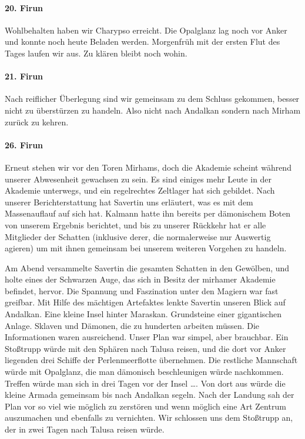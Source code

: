 \paragraph{20. Firun}
Wohlbehalten haben wir Charypso erreicht. Die Opalglanz lag noch vor Anker und konnte noch heute Beladen werden. Morgenfrüh mit der ersten Flut des Tages laufen wir aus. Zu klären bleibt noch wohin.

\paragraph{21. Firun}
Nach reiflicher Überlegung sind wir gemeinsam zu dem Schluss gekommen, besser nicht zu überstürzen zu handeln. Also nicht nach Andalkan sondern nach Mirham zurück zu kehren.

\paragraph{26. Firun}
Erneut stehen wir vor den Toren Mirhams, doch die Akademie scheint während unserer Abwesenheit gewachsen zu sein. Es sind einiges mehr Leute in der Akademie unterwegs, und ein regelrechtes Zeltlager hat sich gebildet.
Nach unserer Berichterstattung hat Savertin uns erläutert, was es mit dem Massenauflauf auf sich hat. Kalmann hatte ihn bereits per dämonischem Boten von unserem Ergebnis berichtet, und bis zu unserer Rückkehr hat er alle Mitglieder der Schatten (inklusive derer, die normalerweise nur Auswertig agieren) um mit ihnen gemeinsam bei unserem weiteren Vorgehen zu handeln.

Am Abend versammelte Savertin die gesamten Schatten in den Gewölben, und holte eines der Schwarzen Auge, das sich in Besitz der mirhamer Akademie befindet, hervor. Die Spannung und Faszination unter den Magiern war fast greifbar. Mit Hilfe des mächtigen Artefaktes lenkte Savertin unseren Blick auf Andalkan. Eine kleine Insel hinter Maraskan. Grundsteine einer gigantischen Anlage. Sklaven und Dämonen, die zu hunderten arbeiten müssen. Die Informationen waren ausreichend. Unser Plan war simpel, aber brauchbar. Ein Stoßtrupp würde mit den Sphären nach Talusa reisen, und die dort vor Anker liegenden drei Schiffe der Perlenmeerflotte übernehmen. Die restliche Mannschaft würde mit Opalglanz, die man dämonisch beschleunigen würde nachkommen. Treffen würde man sich in drei Tagen vor der Insel \dots . Von dort aus würde die kleine Armada gemeinsam bis nach Andalkan segeln. Nach der Landung sah der Plan vor so viel wie möglich zu zerstören und wenn möglich eine Art Zentrum auszumachen und ebenfalls zu vernichten. Wir schlossen uns dem Stoßtrupp an, der in zwei Tagen nach Talusa reisen würde.

